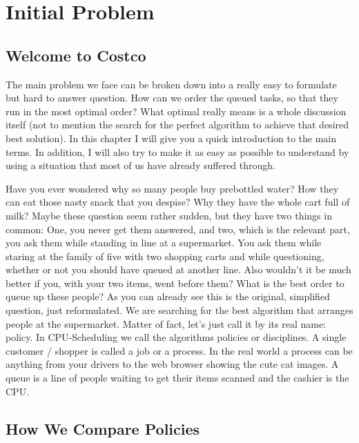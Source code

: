 \chapter{Initial Problem}

\section{Welcome to Costco}

The main problem we face can be broken down into a really easy to formulate but hard to answer question.
How can we order the queued tasks, so that they run in the most optimal order?
What optimal really means is a whole discussion itself (not to mention the search for the perfect algorithm to achieve that desired best solution).
In this chapter I will give you a quick introduction to the main terms.
In addition, I will also try to make it as easy as possible to understand by using a situation that most of us have already suffered through.

Have you ever wondered why so many people buy prebottled water? 
How they can eat those nasty snack that you despise?
Why they have the whole cart full of milk?
Maybe these question seem rather sudden, but they have two things in common:
One, you never get them answered, and two, which is the relevant part, you ask them while standing in line at a supermarket.
You ask them while staring at the family of five with two shopping carts and while questioning, whether or not you should have queued at another line.
Also wouldn't it be much better if you, with your two items, went before them?
What is the best order to queue up these people?
As you can already see this is the original, simplified question, just reformulated.
We are searching for the best algorithm that arranges people at the supermarket.
Matter of fact, let's just call it by its real name: policy.
In CPU-Scheduling we call the algorithms policies or disciplines.
A single customer / shopper is called a job or a process.
In the real world a process can be anything from your drivers to the web browser showing the cute cat images.
A queue is a line of people waiting to get their items scanned and the cashier is the CPU.

\section{How We Compare Policies}

